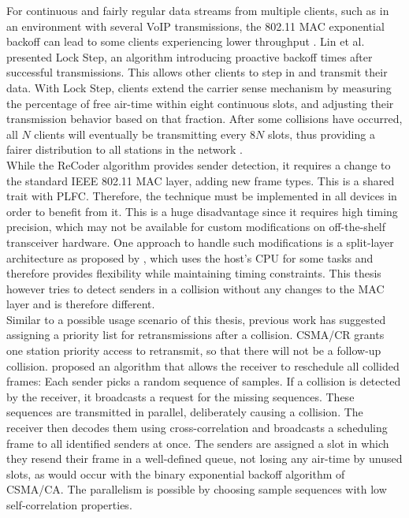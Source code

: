 For continuous and fairly regular data streams from multiple clients, such as in an environment with several VoIP transmissions, the 802.11 \gls{MAC} exponential backoff can lead to some clients experiencing lower throughput \cite{lin2009}. Lin et al. presented Lock Step, an algorithm introducing proactive backoff times after successful transmissions. This allows other clients to step in and transmit their data. With Lock Step, clients extend the carrier sense mechanism by measuring the percentage of free air-time within eight continuous slots, and adjusting their transmission behavior based on that fraction. After some collisions have occurred, all $ N $ clients will eventually be transmitting every $ 8N $ slots, thus providing a fairer distribution to all stations in the network \cite{lin2009}.\\

While the ReCoder algorithm provides sender detection, it requires a change to the standard IEEE 802.11 \gls{MAC} layer, adding new frame types. This is a shared trait with \gls{PLFC}. Therefore, the technique must be implemented in all devices in order to benefit from it. This is a huge disadvantage since it requires high timing precision, which may not be available for custom modifications on off-the-shelf transceiver hardware. One approach to handle such modifications is a split-layer architecture as proposed by \cite{nychis2009}, which uses the host's CPU for some tasks and therefore provides flexibility while maintaining timing constraints. This thesis however tries to detect senders in a collision without any changes to the \gls{MAC} layer and is therefore different.\\

Similar to a possible usage scenario of this thesis, previous work has suggested assigning a priority list for retransmissions after a collision. \gls{CSMA/CR} \cite{choi2013} grants one station priority access to retransmit, so that there will not be a follow-up collision. \cite{zhao2015} proposed an algorithm that allows the receiver to reschedule all collided frames: Each sender picks a random sequence of samples. If a collision is detected by the receiver, it broadcasts a request for the missing sequences. These sequences are transmitted in parallel, deliberately causing a collision. The receiver then decodes them using cross-correlation and broadcasts a scheduling frame to all identified senders at once. The senders are assigned a slot in which they resend their frame in a well-defined queue, not losing any air-time by unused slots, as would occur with the binary exponential backoff algorithm of \gls{CSMA/CA}. The parallelism is possible by choosing sample sequences with low self-correlation properties.


